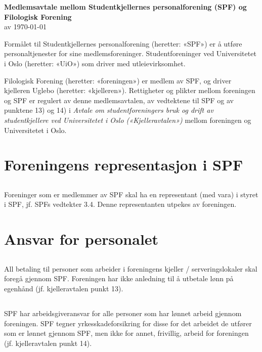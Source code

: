 \documentclass[12pt]{article}
\begin{document}
\pagestyle{fancy}
\fancyhf{}

\begin{center}
    {\LARGE\textbf{Medlemsavtale mellom Studentkjellernes personalforening
    (SPF) og Filologisk Forening}}\\[7pt]
    av \today\\[24pt]
\end{center}

Formålet til Studentkjellernes
personalforening (heretter: «SPF») er å utføre 
personaltjenester for sine medlemsforeninger. Studentforeninger ved Universitetet i Oslo
(heretter: «UiO») som driver med utleievirksomhet.

Filologisk Forening (heretter: «foreningen»)
er medlem av SPF, og driver kjelleren Uglebo (heretter: «kjelleren»). Rettigheter og plikter mellom 
foreningen og SPF er regulert av denne 
medlemsavtalen, av vedtektene til SPF og av punktene 13) og 
14) i \textit{Avtale om studentforeningers bruk og drift av 
studentkjellere ved Universitetet i Oslo
(«Kjelleravtalen»)} mellom foreningen og 
Universitetet i Oslo.
\section{Foreningens representasjon i SPF}
\label{sec:1}
\subsection{}
\label{sub:1.1}
Foreninger som er medlemmer av SPF skal ha en 
representant (med vara) i styret i SPF, jf. SPFs 
vedtekter 3.4. Denne representanten utpekes av 
foreningen.
\section{Ansvar for personalet}
\label{sec:2}
\subsection{}
\label{sub:2.1}
All betaling til personer som arbeider i foreningens kjeller / serveringslokaler
skal foregå gjennom SPF. Foreningen har ikke anledning til å utbetale lønn på egenhånd 
(jf. kjelleravtalen punkt 13).
\subsection{}
\label{sub:2.2}
SPF har arbeidsgiveransvar for alle personer som 
har lønnet arbeid gjennom foreningen. SPF tegner 
yrkesskadeforsikring for disse for det arbeidet de 
utfører som er lønnet gjennom SPF, men ikke for 
annet, frivillig, arbeid for foreningen (jf. 
kjelleravtalen punkt 14).
\end{document}
